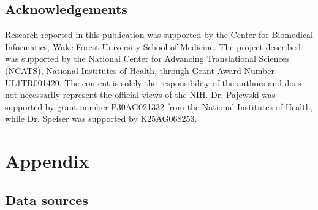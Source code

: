 \documentclass[twoside,11pt]{article}\usepackage[]{graphicx}\usepackage[]{xcolor}
\begin{document}
\subsection*{Acknowledgements}

Research reported in this publication was supported by the Center for Biomedical Informatics, Wake Forest University School of Medicine. The project described was supported by the National Center for Advancing Translational Sciences (NCATS), National Institutes of Health, through Grant Award Number UL1TR001420. The content is solely the responsibility of the authors and does not necessarily represent the official views of the NIH. Dr. Pajewski was supported by grant number P30AG021332 from the National Institutes of Health, while Dr. Speiser was supported by K25AG068253.


\newpage

\appendix

\section*{Appendix}
\captionsetup{labelformat=AppendixTables}
\setcounter{table}{0}

\subsection*{Data sources}
\end{document}

